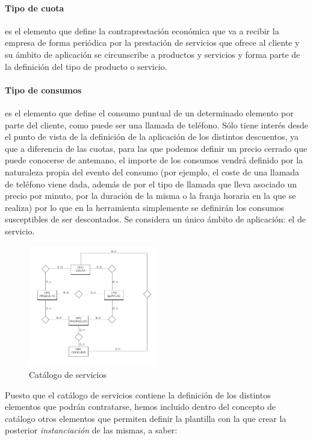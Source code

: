 \paragraph{Tipo de cuota} es el elemento que define la contraprestación económica que va a recibir la empresa de forma periódica por la prestación de servicios que ofrece al cliente y su ámbito de aplicación se circunscribe a productos y servicios y forma parte de la definición del tipo de producto o servicio.
\paragraph{Tipo de consumos} es el elemento que define el consumo puntual de un determinado elemento por parte del cliente, como puede ser una llamada de teléfono. Sólo tiene interés desde el punto de vista de la definición de la aplicación de los distintos descuentos, ya que a diferencia de las cuotas, para las que podemos definir un precio cerrado que puede conocerse de antemano, el importe de los consumos vendrá definido por la naturaleza propia del evento del consumo (por ejemplo, el coste de una llamada de teléfono viene dada, además de por el tipo de llamada que lleva asociado un precio por minuto, por la duración de la misma o la franja horaria en la que se realiza) por lo que en la herramienta simplemente se definirán los consumos susceptibles de ser descontados. Se considera un único ámbito de aplicación: el de servicio.



\begin{figure}[hp!]
  \centering
  \includegraphics[width=0.50\textwidth]{imaxes/catalogo.png}
  \caption{Catálogo de servicios}
  \label{fig:catalogo}
\end{figure}


Puesto que el catálogo de servicios contiene la definición de los distintos elementos que podrán contratarse, hemos incluido dentro del concepto de catálogo otros elementos que permiten definir la plantilla con la que crear la posterior \textit{instanciación} de las mismas, a saber:


